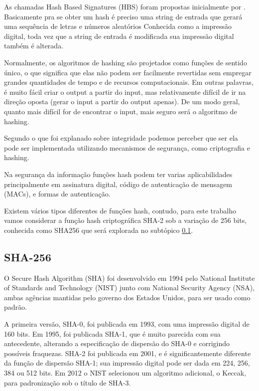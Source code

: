 \documentclass[12pt, a4paper]{report}
\begin{document}
As chamadas Hash Based Signatures (HBS) foram propostas inicialmente por \cite{lamport1979constructing}. Basicamente pra se obter um hash é preciso uma string de entrada  que gerará uma sequência de letras e números aleatórios Conhecida como a impressão digital, toda vez que a string de entrada é modificada sua impressão digital também é alterada.

Normalmente, os algoritmos de hashing  são projetados como funções de sentido único, o que significa que elas não podem ser facilmente revertidas sem empregar grandes quantidades de tempo e de recursos computacionais. Em outras palavras, é muito fácil criar o output a partir do input, mas relativamente difícil de ir na direção oposta (gerar o input a partir do output apenas). De um modo geral, quanto mais difícil for de encontrar o input, mais seguro será o algoritmo de hashing.

Segundo o que foi explanado sobre integridade podemos perceber que ser ela pode ser implementada utilizando mecanismos de segurança, como criptografia e hashing.

Na segurança da informação funções hash podem ter varias aplicabilidades principalmente em assinatura digital, código de autenticação de mensagem (MACs), e formas de autenticação. 

Existem vários tipos diferentes de funções hash, contudo, para este trabalho vamos considerar a função hash criptográfica SHA-2 sob a variação de 256 bits, conhecida como SHA256 que será explorada no subtópico \ref{subsec:sha256}.

\subsection{SHA-256}
\label{subsec:sha256}

O Secure Hash Algorithm (SHA) foi desenvolvido em 1994 pelo National Institute of Standards and Technology (NIST) junto com National Security Agency (NSA), ambas agências mantidas pelo governo dos Estados Unidos, para ser usado como padrão.

A primeira versão, SHA-0, foi publicada em 1993, com uma impressão digital de 160 bits. Em 1995, foi publicada SHA-1, que é muito parecida com sua antecedente, alterando a especificação de dispersão do SHA-0 e corrigindo possíveis fraquezas. SHA-2 foi publicada em 2001, e é significantemente diferente da função de dispersão SHA-1; sua impressão digital pode ser dada em 224, 256, 384 ou 512 bits. Em 2012 o NIST selecionou um algoritmo adicional, o Keccak, para padronização sob o título de SHA-3.
\end{document}
